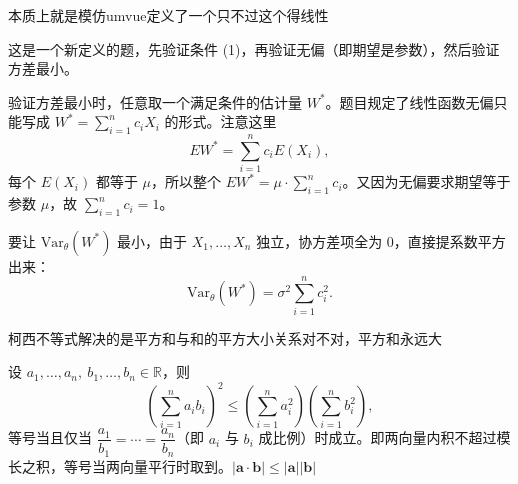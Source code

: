 \begin{dxtips}
    本质上就是模仿umvue定义了一个只不过这个得线性
\end{dxtips}
\begin{dxtips}
   
这是一个新定义的题，先验证条件 (1)，再验证无偏（即期望是参数），然后验证方差最小。

验证方差最小时，任意取一个满足条件的估计量 $W^*$。题目规定了线性函数无偏只能写成 $W^* = \sum_{i=1}^n c_i X_i$ 的形式。注意这里
$$
EW^* = \sum_{i=1}^n c_i E(X_i),
$$
每个 $E(X_i)$ 都等于 $\mu$，所以整个 $EW^* = \mu \cdot \sum_{i=1}^n c_i$。又因为无偏要求期望等于参数 $\mu$，故 $\sum_{i=1}^n c_i = 1$。

要让 $\mathrm{Var}_\theta(W^*)$ 最小，由于 $X_1,\ldots,X_n$ 独立，协方差项全为 $0$，直接提系数平方出来：
$$
\mathrm{Var}_\theta(W^*) = \sigma^2 \sum_{i=1}^n c_i^2.
$$

\end{dxtips}
\begin{dxtips}
    柯西不等式解决的是平方和与和的平方大小关系对不对，平方和永远大
\end{dxtips}
\begin{theorem}
设 $a_1, \ldots, a_n,\ b_1, \ldots, b_n \in \mathbb{R}$，则
$$
\left(\sum_{i=1}^n a_i b_i\right)^2 \leq \left(\sum_{i=1}^n a_i^2\right)\left(\sum_{i=1}^n b_i^2\right),
$$
等号当且仅当 $\dfrac{a_1}{b_1} = \cdots = \dfrac{a_n}{b_n}$（即 $a_i$ 与 $b_i$ 成比例）时成立。即两向量内积不超过模长之积，等号当两向量平行时取到。$|\mathbf{a} \cdot \mathbf{b}| \leq |\mathbf{a}||\mathbf{b}|$
\end{theorem}

